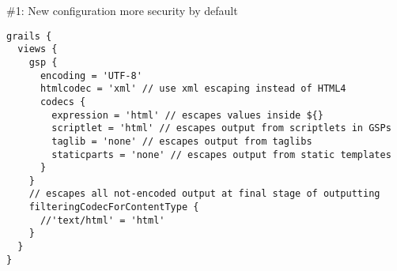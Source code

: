 \begin{frame}

    \begin{center}
      \Huge\color{green} \#1: New configuration more security by default
    \end{center}

    \begin{center}
      \begin{minipage}{1.1\textwidth}
        \begin{verbatim}
grails {
  views {
    gsp {
      encoding = 'UTF-8'
      htmlcodec = 'xml' // use xml escaping instead of HTML4
      codecs {
        expression = 'html' // escapes values inside ${}
        scriptlet = 'html' // escapes output from scriptlets in GSPs
        taglib = 'none' // escapes output from taglibs
        staticparts = 'none' // escapes output from static templates
      }
    }
    // escapes all not-encoded output at final stage of outputting
    filteringCodecForContentType {
      //'text/html' = 'html'
    }
  }
}
        \end{verbatim}
      \end{minipage}
    \end{center}

\end{frame}


